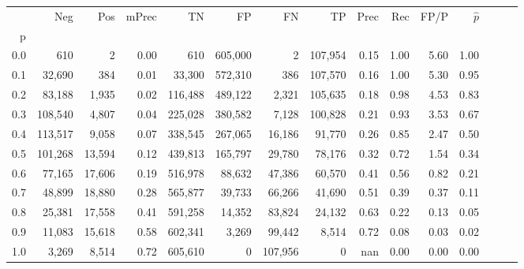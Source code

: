 \begin{tabular}{rrrrrrrrrrrrrrr}
\toprule
{} &      Neg &     Pos & mPrec &       TN &       FP &       FN &       TP &  Prec &   Rec &  FP/P & $\hat{p}$ \\
p   &          &         &       &          &          &          &          &       &       &       &           \\
\midrule
0.0 &      610 &       2 &  0.00 &      610 &  605,000 &        2 &  107,954 &  0.15 &  1.00 &  5.60 &      1.00 \\
0.1 &   32,690 &     384 &  0.01 &   33,300 &  572,310 &      386 &  107,570 &  0.16 &  1.00 &  5.30 &      0.95 \\
0.2 &   83,188 &   1,935 &  0.02 &  116,488 &  489,122 &    2,321 &  105,635 &  0.18 &  0.98 &  4.53 &      0.83 \\
0.3 &  108,540 &   4,807 &  0.04 &  225,028 &  380,582 &    7,128 &  100,828 &  0.21 &  0.93 &  3.53 &      0.67 \\
0.4 &  113,517 &   9,058 &  0.07 &  338,545 &  267,065 &   16,186 &   91,770 &  0.26 &  0.85 &  2.47 &      0.50 \\
0.5 &  101,268 &  13,594 &  0.12 &  439,813 &  165,797 &   29,780 &   78,176 &  0.32 &  0.72 &  1.54 &      0.34 \\
0.6 &   77,165 &  17,606 &  0.19 &  516,978 &   88,632 &   47,386 &   60,570 &  0.41 &  0.56 &  0.82 &      0.21 \\
0.7 &   48,899 &  18,880 &  0.28 &  565,877 &   39,733 &   66,266 &   41,690 &  0.51 &  0.39 &  0.37 &      0.11 \\
0.8 &   25,381 &  17,558 &  0.41 &  591,258 &   14,352 &   83,824 &   24,132 &  0.63 &  0.22 &  0.13 &      0.05 \\
0.9 &   11,083 &  15,618 &  0.58 &  602,341 &    3,269 &   99,442 &    8,514 &  0.72 &  0.08 &  0.03 &      0.02 \\
1.0 &    3,269 &   8,514 &  0.72 &  605,610 &        0 &  107,956 &        0 &   nan &  0.00 &  0.00 &      0.00 \\
\bottomrule
\end{tabular}
